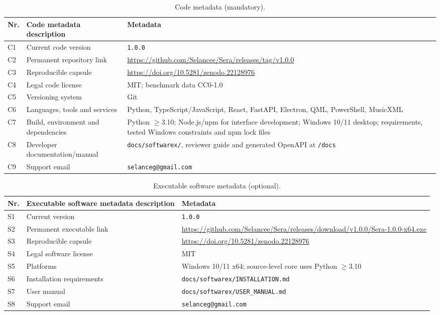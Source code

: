 \documentclass[preprint,12pt,a4paper]{elsarticle}
\begin{document}
\begin{table}[!ht]
\small
\begin{tabularx}{\textwidth}{@{}l p{} X@{}}
\toprule
Nr. & Code metadata description & Metadata \\
\midrule
C1 & Current code version & \texttt{1.0.0} \\
C2 & Permanent repository link & \url{https://github.com/Selancee/Sera/releases/tag/v1.0.0} \\
C3 & Reproducible capsule & \url{https://doi.org/10.5281/zenodo.22128976} \\
C4 & Legal code license & MIT; benchmark data CC0-1.0 \\
C5 & Versioning system & Git \\
C6 & Languages, tools and services & Python, TypeScript/JavaScript, React, FastAPI, Electron, QML, PowerShell, MusicXML \\
C7 & Build, environment and dependencies & Python $\geq$3.10; Node.js/npm for interface development; Windows 10/11 desktop; requirements, tested Windows constraints and npm lock files \\
C8 & Developer documentation/manual & \texttt{docs/softwarex/}, reviewer guide and generated OpenAPI at \texttt{/docs} \\
C9 & Support email & \texttt{selanceg@gmail.com} \\
\bottomrule
\end{tabularx}
\caption{Code metadata (mandatory).}
\label{tab:code-metadata}
\end{table}

\begin{table}[!ht]
\small
\begin{tabularx}{\textwidth}{@{}l p{} X@{}}
\toprule
Nr. & Executable software metadata description & Metadata \\
\midrule
S1 & Current version & \texttt{1.0.0} \\
S2 & Permanent executable link & \url{https://github.com/Selancee/Sera/releases/download/v1.0.0/Sera-1.0.0-x64.exe} \\
S3 & Reproducible capsule & \url{https://doi.org/10.5281/zenodo.22128976} \\
S4 & Legal software license & MIT \\
S5 & Platforms & Windows 10/11 x64; source-level core uses Python $\geq$3.10 \\
S6 & Installation requirements & \texttt{docs/softwarex/INSTALLATION.md} \\
S7 & User manual & \texttt{docs/softwarex/USER\_MANUAL.md} \\
S8 & Support email & \texttt{selanceg@gmail.com} \\
\bottomrule
\end{tabularx}
\caption{Executable software metadata (optional).}
\label{tab:software-metadata}
\end{table}
\end{document}
